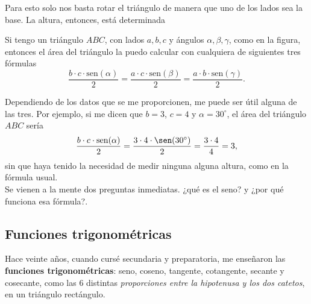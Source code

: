 \begin{figure}[h]
\begin{subfigure}{.45 \textwidth}
\end{subfigure}
\end{figure}

Para esto solo nos basta rotar el triángulo de manera que uno de los lados sea la base. La altura, entonces, está determinada

Si tengo un triángulo $ABC$, con lados $a,b,c$ y ángulos $\alpha, \beta, \gamma$, como en la figura, entonces el área del triángulo la puedo calcular con cualquiera de siguientes tres fórmulas $$\frac{b\cdot c\cdot \mathrm{sen}(\alpha)}{2}=\frac{a\cdot c\cdot \mathrm{sen}(\beta)}{2}=\frac{a\cdot b\cdot \mathrm{sen}(\gamma)}{2}.$$

Dependiendo de los datos que se me proporcionen, me puede ser útil alguna de las tres. Por ejemplo, si me dicen que $b=3$, $c=4$ y $\alpha=30^{\circ}$, el área del triángulo $ABC$ sería $$\frac{b\cdot c\cdot \mathrm{sen}(\alpha)}{2}=\frac{3\cdot 4 \cdot \sen(30^{\circ})}{2}=\frac{3\cdot 4}{4}=3,$$
sin que haya tenido la necesidad de medir ninguna alguna altura, como en la fórmula usual.\\

Se vienen a la mente dos preguntas inmediatas. ¿qué es el seno? y ¿por qué funciona esa fórmula?.

\subsection*{Funciones trigonométricas}

Hace veinte años, cuando cursé secundaria y preparatoria, me enseñaron las {\bf funciones trigonométricas}: seno, coseno, tangente, cotangente, secante y cosecante, como las 6 distintas \emph{proporciones entre la hipotenusa y los dos catetos}, en un triángulo rectángulo.\\

